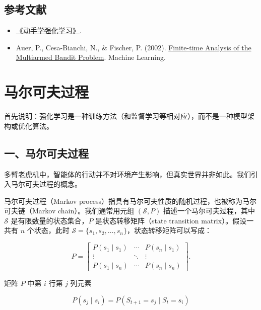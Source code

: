 \hypertarget{ux53c2ux8003ux6587ux732e-40}{%
\subsection{参考文献}\label{ux53c2ux8003ux6587ux732e-40}}

\begin{itemize}
\tightlist
\item
  \href{https://hrl.boyuai.com/}{《动手学强化学习》}.
\item
  Auer, P., Cesa-Bianchi, N., \& Fischer, P. (2002). \href{https://link.springer.com/article/10.1023/A:1013689704352}{Finite-time Analysis of the Multiarmed Bandit Problem}. Machine Learning.
\end{itemize}

\clearpage

\hypertarget{ux9a6cux5c14ux53efux592bux8fc7ux7a0b}{%
\section{马尔可夫过程}\label{ux9a6cux5c14ux53efux592bux8fc7ux7a0b}}

首先说明：强化学习是一种训练方法（和监督学习等相对应），而不是一种模型架构或优化算法。

\hypertarget{ux4e00ux9a6cux5c14ux53efux592bux8fc7ux7a0b}{%
\subsection{一、马尔可夫过程}\label{ux4e00ux9a6cux5c14ux53efux592bux8fc7ux7a0b}}

多臂老虎机中，智能体的行动并不对环境产生影响，但真实世界并非如此。我们引入马尔可夫过程的概念。

马尔可夫过程（Markov process）指具有马尔可夫性质的随机过程，也被称为马尔可夫链（Markov chain）。我们通常用元组 \((\mathcal{S},P)\) 描述一个马尔可夫过程，其中 \(\mathcal{S}\) 是有限数量的状态集合，\(P\) 是状态转移矩阵（state transition matrix）。假设一共有 \(n\) 个状态，此时 \(\mathcal{S}=\{s_1,s_2,\ldots,s_n\}\)，状态转移矩阵可以写成：

\[
P=
\begin{bmatrix}
P(s_1\mid s_1) & \cdots & P(s_n\mid s_1)\\
\vdots & \ddots & \vdots\\
P(s_1\mid s_n) & \cdots & P(s_n\mid s_n)
\end{bmatrix}.
\]

矩阵 \(P\) 中第 \(i\) 行第 \(j\) 列元素

\[
P(s_j\mid s_i)=P(S_{t+1}=s_j\mid S_t=s_i)
\]

